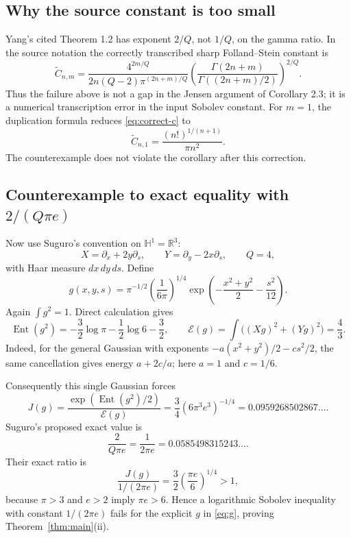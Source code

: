 \documentclass[11pt]{article}
\newcommand{\HH}{\mathbb H}
\newcommand{\R}{\mathbb R}
\newcommand{\Ent}{\operatorname{Ent}}
\newcommand{\E}{\mathcal E}
\begin{document}
\subsection{Why the source constant is too small}

Yang's cited Theorem 1.2 has exponent $2/Q$, not $1/Q$, on the gamma ratio.
In the source notation the correctly transcribed sharp Folland--Stein
constant is
\begin{equation}\label{eq:correct-c}
 \widetilde C_{n,m}=
 \frac{4^{2m/Q}}{2n(Q-2)\pi^{(2n+m)/Q}}
 \left(
 \frac{\Gamma(2n+m)}{\Gamma((2n+m)/2)}
 \right)^{2/Q}.
\end{equation}
Thus the failure above is not a gap in the Jensen argument of Corollary 2.3;
it is a numerical transcription error in the input Sobolev constant.  For
$m=1$, the duplication formula reduces \eqref{eq:correct-c} to
\[
 \widetilde C_{n,1}=\frac{(n!)^{1/(n+1)}}{\pi n^2}.
\]
The counterexample does not violate the corollary after this correction.

\subsection{Counterexample to exact equality with \texorpdfstring{$2/(Q\pi e)$}{2/(Q pi e)}}

Now use Suguro's convention on $\HH^1=\R^3$:
\[
 X=\partial_x+2y\partial_s,
 \qquad Y=\partial_y-2x\partial_s,
 \qquad Q=4,
\]
with Haar measure $dx\,dy\,ds$.  Define
\begin{equation}\label{eq:g}
 g(x,y,s)=\pi^{-1/2}\left(\frac1{6\pi}\right)^{1/4}
 \exp\!\left(-\frac{x^2+y^2}{2}-\frac{s^2}{12}\right).
\end{equation}
Again $\int g^2=1$.  Direct calculation gives
\begin{equation}\label{eq:g-ent-energy}
 \Ent(g^2)=-\frac32\log\pi-\frac12\log6-\frac32,
 \qquad
 \E(g)=\int\bigl((Xg)^2+(Yg)^2\bigr)=\frac43.
\end{equation}
Indeed, for the general Gaussian with exponents
$-a(x^2+y^2)/2-cs^2/2$, the same cancellation gives energy
$a+2c/a$; here $a=1$ and $c=1/6$.

Consequently this single Gaussian forces
\begin{equation}\label{eq:jg}
 J(g)=\frac{\exp(\Ent(g^2)/2)}{\E(g)}
 =\frac34(6\pi^3e^3)^{-1/4}
 =0.0959268502867\ldots .
\end{equation}
Suguro's proposed exact value is
\[
 \frac{2}{Q\pi e}=\frac1{2\pi e}=0.0585498315243\ldots .
\]
Their exact ratio is
\begin{equation}\label{eq:ratio-two}
 \frac{J(g)}{1/(2\pi e)}
 =\frac32\left(\frac{\pi e}{6}\right)^{1/4}>1,
\end{equation}
because $\pi>3$ and $e>2$ imply $\pi e>6$.  Hence a logarithmic Sobolev
inequality with constant $1/(2\pi e)$ fails for the explicit $g$ in
\eqref{eq:g}, proving Theorem~\ref{thm:main}(ii).
\end{document}
